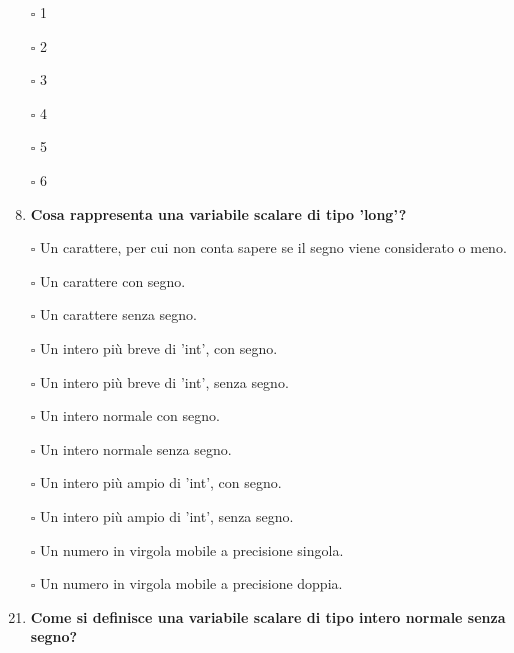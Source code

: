 \documentclass[11pt]{article}
\begin{document}
\begin{enumerate}
\item[$\square$] 1
\item[$\square$] 2
\item[$\square$] 3
\item[$\square$] 4
\item[$\square$] 5
\item[$\square$] 6
\item [\nonumber]
\item{\bf Cosa rappresenta una variabile scalare di tipo 'long'?}

\item[$\square$] Un carattere, per cui non conta sapere se il segno viene considerato o meno.
\item[$\square$] Un carattere con segno.
\item[$\square$] Un carattere senza segno.
\item[$\square$] Un intero pi\`{u} breve di 'int', con segno.
\item[$\square$] Un intero pi\`{u} breve di 'int', senza segno.
\item[$\square$] Un intero normale con segno.
\item[$\square$] Un intero normale senza segno.
\item[$\square$] Un intero pi\`{u} ampio di 'int', con segno.
\item[$\square$] Un intero pi\`{u} ampio di 'int', senza segno.
\item[$\square$] Un numero in virgola mobile a precisione singola.
\item[$\square$] Un numero in virgola mobile a precisione doppia.
\item [\nonumber]
 \item {\bf Come si definisce una variabile scalare di tipo intero normale senza segno?}
 

\end{enumerate}
\end{document}
